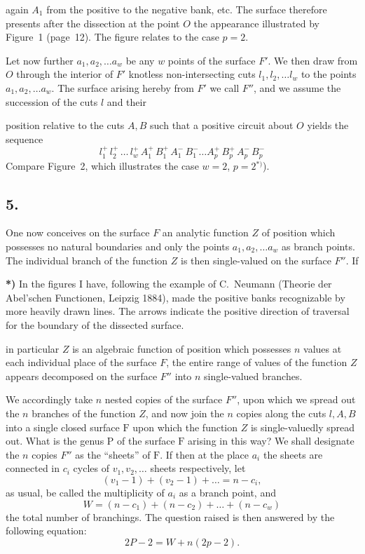 \documentclass{article}
\begin{document}
again $A_1$ from the positive to the negative bank, etc. The surface therefore presents after the dissection at the point $O$ the appearance illustrated by Figure~1 (page~12). The figure relates to the case $p = 2$.

Let now further $a_1, a_2, \dots a_w$ be any $w$ points of the surface $F'$. We then draw from $O$ through the interior of $F'$ knotless non-intersecting cuts $l_1, l_2, \dots l_w$ to the points $a_1, a_2, \dots a_w$. The surface arising hereby from $F'$ we call $F''$, and we assume the succession of the cuts $l$ and their


position relative to the cuts $A, B$ such that a positive circuit about $O$ yields the sequence
\[
l_1^+ \, l_2^+ \, \dots \, l_w^+ \, A_1^+ \, B_1^+ \, A_1^- \, B_1^- \dots A_p^+ \, B_p^+ \, A_p^- \, B_p^-
\]
Compare Figure~2, which illustrates the case $w = 2$, $p = 2$${}^{*)}$).

\subsection*{5.}

One now conceives on the surface $F$ an analytic function $Z$ of position which possesses no natural boundaries and only the points $a_1, a_2, \dots a_w$ as branch points. The individual branch of the function $Z$ is then single-valued on the surface $F''$. If

\textbf{*)} In the figures I have, following the example of C.~Neumann (Theorie der Abel'schen Functionen, Leipzig 1884), made the positive banks recognizable by more heavily drawn lines. The arrows indicate the positive direction of traversal for the boundary of the dissected surface.

in particular $Z$ is an algebraic function of position which possesses $n$ values at each individual place of the surface $F$, the entire range of values of the function $Z$ appears decomposed on the surface $F''$ into $n$ single-valued branches.

We accordingly take $n$ nested copies of the surface $F''$, upon which we spread out the $n$ branches of the function $Z$, and now join the $n$ copies along the cuts $l, A, B$ into a single closed surface $\mathrm{F}$ upon which the function $Z$ is single-valuedly spread out. What is the genus $\mathrm{P}$ of the surface $\mathrm{F}$ arising in this way? We shall designate the $n$ copies $F''$ as the ``sheets'' of $\mathrm{F}$. If then at the place $a_i$ the sheets are connected in $c_i$ cycles of $v_1, v_2, \dots$ sheets respectively, let
\[
(v_1 - 1) + (v_2 - 1) + \dots = n - c_i,
\]
as usual, be called the multiplicity of $a_i$ as a branch point, and
\[
W = (n - c_1) + (n - c_2) + \dots + (n - c_w)
\]
the total number of branchings. The question raised is then answered by the following equation:
\[
2P - 2 = W + n(2p - 2).
\tag{1}
\]
\end{document}
